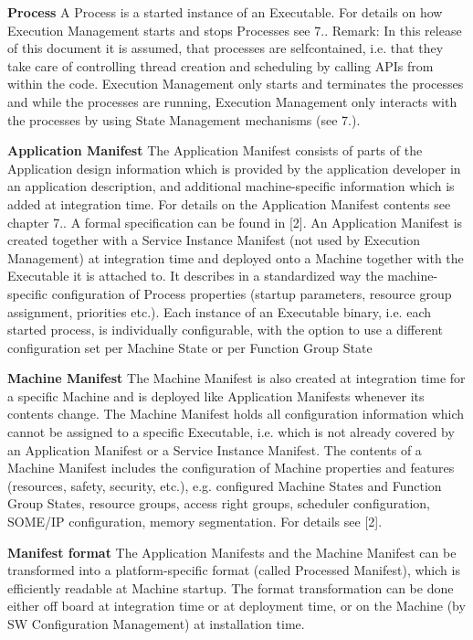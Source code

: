 \begin{DoxyItemize}
\item {\bfseries Process} A Process is a started instance of an Executable. For details on how Execution Management starts and stops Processes see 7.. Remark\+: In this release of this document it is assumed, that processes are selfcontained, i.\+e. that they take care of controlling thread creation and scheduling by calling A\+P\+Is from within the code. Execution Management only starts and terminates the processes and while the processes are running, Execution Management only interacts with the processes by using State Management mechanisms (see 7.).
\item {\bfseries Application Manifest} The Application Manifest consists of parts of the Application design information which is provided by the application developer in an application description, and additional machine-\/specific information which is added at integration time. For details on the Application Manifest contents see chapter 7.. A formal specification can be found in \mbox{[}2\mbox{]}. An Application Manifest is created together with a Service Instance Manifest (not used by Execution Management) at integration time and deployed onto a Machine together with the Executable it is attached to. It describes in a standardized way the machine-\/specific configuration of Process properties (startup parameters, resource group assignment, priorities etc.). Each instance of an Executable binary, i.\+e. each started process, is individually configurable, with the option to use a different configuration set per Machine State or per Function Group State
\item {\bfseries Machine Manifest} The Machine Manifest is also created at integration time for a specific Machine and is deployed like Application Manifests whenever its contents change. The Machine Manifest holds all configuration information which cannot be assigned to a specific Executable, i.\+e. which is not already covered by an Application Manifest or a Service Instance Manifest. The contents of a Machine Manifest includes the configuration of Machine properties and features (resources, safety, security, etc.), e.\+g. configured Machine States and Function Group States, resource groups, access right groups, scheduler configuration, S\+O\+M\+E/\+IP configuration, memory segmentation. For details see \mbox{[}2\mbox{]}.
\item {\bfseries Manifest format} The Application Manifests and the Machine Manifest can be transformed into a platform-\/specific format (called Processed Manifest), which is efficiently readable at Machine startup. The format transformation can be done either off board at integration time or at deployment time, or on the Machine (by SW Configuration Management) at installation time.

\end{DoxyItemize}

